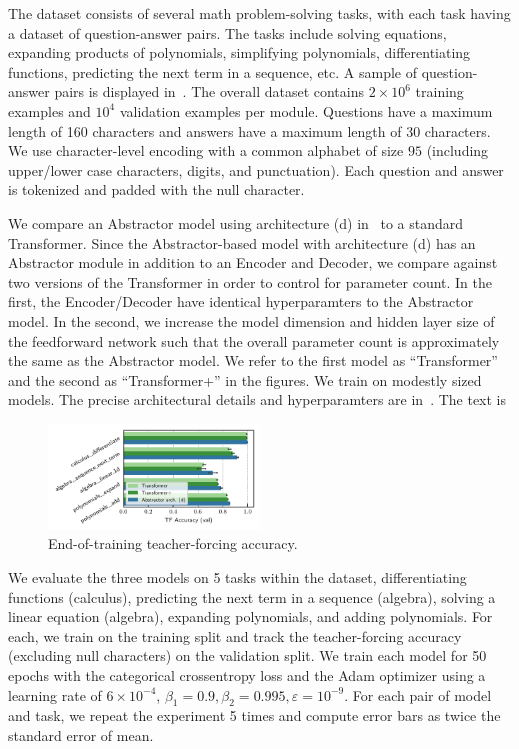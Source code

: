 The dataset consists of several math problem-solving tasks, with each task having a dataset of question-answer pairs. The tasks include solving equations, expanding products of polynomials, simplifying polynomials, differentiating functions, predicting the next term in a sequence, etc. A sample of question-answer pairs is displayed in~. The overall dataset contains $2 \times 10^6$ training examples and $10^4$ validation examples per module. Questions have a maximum length of 160 characters and answers have a maximum length of 30 characters. We use character-level encoding with a common alphabet of size $95$ (including upper/lower case characters, digits, and punctuation). Each question and answer is tokenized and padded with the null character.

We compare an Abstractor model using architecture (d) in~ to a standard Transformer. Since the Abstractor-based model with architecture (d) has an Abstractor module in addition to an Encoder and Decoder, we compare against two versions of the Transformer in order to control for parameter count. In the first, the Encoder/Decoder have identical hyperparamters to the Abstractor model. In the second, we increase the model dimension and hidden layer size of the feedforward network such that the overall parameter count is approximately the same as the Abstractor model. We refer to the first model as ``Transformer'' and the second as ``Transformer+'' in the figures. We train on modestly sized models. The precise architectural details and hyperparamters are in~. The text is 

\begin{figure}
    \centering
    \includegraphics[width=0.5\textwidth]{figures/experiments/math_metrics.pdf}
    \caption{\footnotesize End-of-training teacher-forcing accuracy.}\label{fig:math_metrics}
\end{figure}

We evaluate the three models on 5 tasks within the dataset, differentiating functions (calculus), predicting the next term in a sequence (algebra), solving a linear equation (algebra), expanding polynomials, and adding polynomials. For each, we train on the training split and track the teacher-forcing accuracy (excluding null characters) on the validation split. We train each model for 50 epochs with the categorical crossentropy loss and the Adam optimizer using a learning rate of $6 \times 10^{-4}$, $\beta_1 = 0.9, \beta_2 = 0.995, \varepsilon = 10^{-9}$. For each pair of model and task, we repeat the experiment 5 times and compute error bars as twice the standard error of mean.

